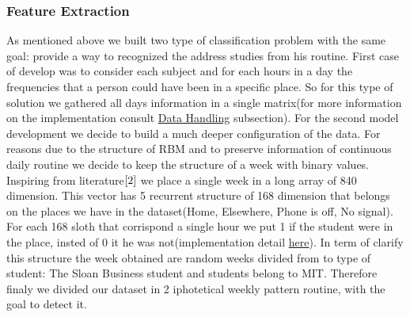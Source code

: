 \documentclass[paper=letter, fontsize=12pt]{article}
\begin{document}
\subsubsection{Feature Extraction}
\label{sec:featureextraction}
As mentioned above we built two type of classification problem with the same goal: provide a way to recognized the address studies from his routine.\newline
First case of develop was to consider each subject and for each hours in a day the frequencies that a person could have been in a specific place. So for this type of solution we gathered all days information  in a single matrix(for more information on the implementation consult \hyperref[sec:datahandling]{Data Handling} subsection).\newline
For the second model development we decide to build a much deeper configuration of the data.
For reasons due to the structure of RBM and to preserve information of continuous daily routine we decide to keep the structure of a week with binary values.\newline
Inspiring from literature${\ref{2}}$ we place a single week in a long array of 840 dimension.
This vector has 5 recurrent structure of 168 dimension that belongs on the places we have in the dataset(Home, Elsewhere, Phone is off, No signal). For each 168 sloth that corrispond a single hour we put 1 if the student were in the place, insted of 0 it he was not(implementation detail \hyperref[sec:feauturerimpl]{here}).\newline
In term of clarify this structure the week obtained are random weeks divided from to type of student: The Sloan Business student and students belong to MIT. Therefore finaly we divided our dataset in 2 iphotetical weekly pattern routine, with the goal to detect it.
\end{document}
